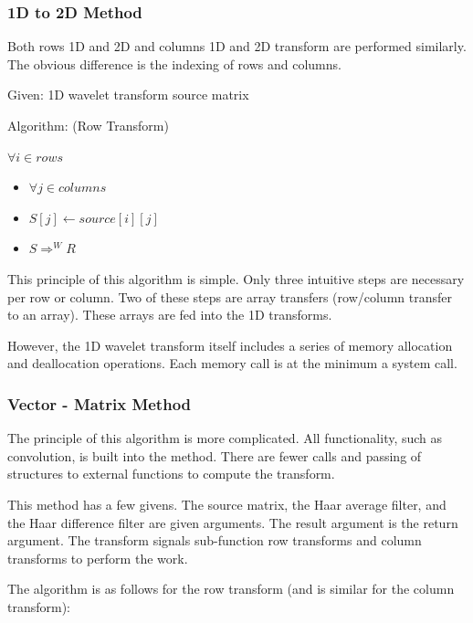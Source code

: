 \subsubsection{1D to 2D Method}

Both rows 1D and 2D and columns 1D and 2D transform are performed
similarly.  The obvious difference is the indexing of rows and
columns.

Given: 1D wavelet transform
source matrix

Algorithm: (Row Transform)

$\forall i \in rows$
\begin{itemize}
	\item $\forall j \in columns$
	
	\item $S[j] \leftarrow source[i][j] $
	
	\item $S \Rightarrow ^W  R$
\end{itemize}

This principle of this algorithm is simple.  Only three intuitive steps are necessary per row or column.  Two of these steps are array transfers (row/column transfer to an array).  These arrays are fed into the 1D transforms.  

However, the 1D wavelet transform itself includes a series of memory allocation and deallocation operations.  Each memory call is at the minimum a system call.  

\subsubsection {Vector - Matrix Method}
The principle of this algorithm is more complicated.  All functionality, such as convolution, is built into the method.  There are fewer calls and passing of structures to external functions to compute the transform.  

This method has a few givens.  The source matrix, the Haar average filter, and the Haar difference filter are given arguments.  The result argument is the return argument.    The transform signals sub-function row transforms and column transforms to perform the work.  

The algorithm is as follows for the row transform (and is similar for the column transform):  

